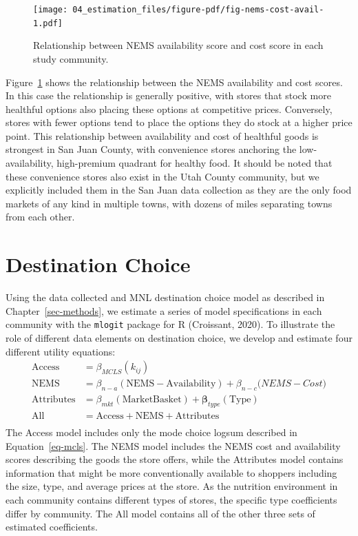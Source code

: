 \documentclass[
  letterpaper,
  DIV=11,
  numbers=noendperiod]{scrreport}
\begin{document}
\begin{figure}[t]

{\centering \texttt{[image: 04\_estimation\_files/figure-pdf/fig-nems-cost-avail-1.pdf]}

}

\caption{\label{fig-nems-cost-avail}Relationship between NEMS
availability score and cost score in each study community.}

\end{figure}

Figure~\ref{fig-nems-cost-avail} shows the relationship between the NEMS
availability and cost scores. In this case the relationship is generally
positive, with stores that stock more healthful options also placing
these options at competitive prices. Conversely, stores with fewer
options tend to place the options they do stock at a higher price point.
This relationship between availability and cost of healthful goods is
strongest in San Juan County, with convenience stores anchoring the
low-availability, high-premium quadrant for healthy food. It should be
noted that these convenience stores also exist in the Utah County
community, but we explicitly included them in the San Juan data
collection as they are the only food markets of any kind in multiple
towns, with dozens of miles separating towns from each other.

\hypertarget{sec-estimation}{%
\section{Destination Choice}\label{sec-estimation}}

Using the data collected and MNL destination choice model as described
in Chapter~\ref{sec-methods}, we estimate a series of model
specifications in each community with the \texttt{mlogit} package for R
(Croissant, 2020). To illustrate the role of different data elements on
destination choice, we develop and estimate four different utility
equations: \begin{align*}
\mathrm{Access} &= \beta_{MCLS}( k_{ij})\\
\mathrm{NEMS} &= \beta_{n-a} (\mathrm{NEMS-Availability}) + \beta_{n-c}\mathrm({NEMS-Cost})\\
\mathrm{Attributes} &= \beta_{mkt} (\mathrm{Market Basket}) + \mathbf{\beta}_{type}(\mathrm{Type})\\
\mathrm{All} &= \mathrm{Access} + \mathrm{NEMS} + \mathrm{Attributes}\\
\end{align*} The Access model includes only the mode choice logsum
described in Equation~\ref{eq-mcls}. The NEMS model includes the NEMS
cost and availability scores describing the goods the store offers,
while the Attributes model contains information that might be more
conventionally available to shoppers including the size, type, and
average prices at the store. As the nutrition environment in each
community contains different types of stores, the specific type
coefficients differ by community. The All model contains all of the
other three sets of estimated coefficients.
\end{document}

